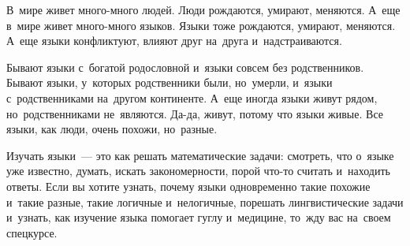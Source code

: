 



В~мире живет много-много людей.
Люди рождаются, умирают, меняются.
А~еще в~мире живет много-много языков.
Языки тоже рождаются, умирают, меняются.
А~еще языки конфликтуют, влияют друг на~друга и~надстраиваются.

Бывают языки с~богатой родословной и~языки совсем без родственников.
Бывают языки, у~которых родственники были, но~умерли, и~языки с~родственниками
на~другом континенте.
А~еще иногда языки живут рядом, но~родственниками не~являются.
Да-да, живут, потому что языки живые.
Все языки, как люди, очень похожи, но~разные.

Изучать языки~--- это как решать математические задачи:
смотреть, что о~языке уже известно, думать, искать закономерности, порой что-то
считать и~находить ответы.
Если вы хотите узнать, почему языки одновременно такие похожие и~такие разные,
такие логичные и~нелогичные, порешать лингвистические задачи и~узнать, как
изучение языка помогает гуглу и~медицине, то~жду вас на~своем спецкурсе.

